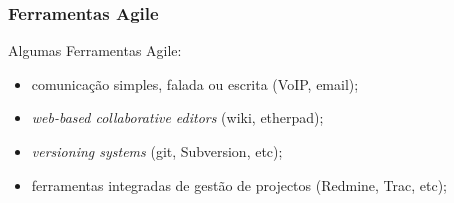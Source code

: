 \documentclass[hyperref={pdfpagelabels=true}]{beamer}
\begin{document}

\begin{frame}
\frametitle{Ferramentas Agile}
Algumas Ferramentas Agile:
\begin{itemize}
  \item comunica\c{c}\~{a}o simples, falada ou escrita (VoIP, email);%
  \item \textit{web-based collaborative editors} (wiki, etherpad);%
  \item \textit{versioning systems} (git, Subversion, etc);
  \item ferramentas integradas de gest\~{a}o de projectos (Redmine, Trac, etc);
\end{itemize}
\end{frame}
\end{document}
